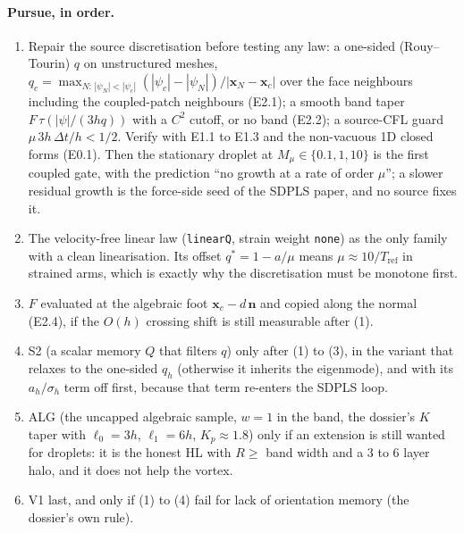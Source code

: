 \documentclass[11pt,a4paper]{article}
\newcommand{\bn}{\mathbf{n}}
\newcommand{\bx}{\mathbf{x}}
\begin{document}
\paragraph{Pursue, in order.}
\begin{enumerate}
  \item Repair the source discretisation before testing any law: a one-sided (Rouy--Tourin) $q$
  on unstructured meshes, $q_c=\max_{N:\,|\psi_N|<|\psi_c|}(|\psi_c|-|\psi_N|)/|\bx_N-\bx_c|$
  over the face neighbours including the coupled-patch neighbours (E2.1); a smooth band taper
  $F\,\tau(|\psi|/(3hq))$ with a $C^2$ cutoff, or no band (E2.2); a source-CFL guard
  $\mu\,3h\,\Delta t/h<1/2$. Verify with E1.1 to E1.3 and the non-vacuous 1D closed forms
  (E0.1). Then the stationary droplet at $M_\mu\in\{0.1,1,10\}$ is the first coupled gate, with
  the prediction ``no growth at a rate of order $\mu$''; a slower residual growth is the
  force-side seed of the SDPLS paper, and no source fixes it.
  \item The velocity-free linear law (\texttt{linearQ}, strain weight \texttt{none}) as the
  only family with a clean linearisation. Its offset $q^*=1-a/\mu$ means $\mu\approx10/T_\mathrm{ref}$
  in strained arms, which is exactly why the discretisation must be monotone first.
  \item $F$ evaluated at the algebraic foot $\bx_c-d\,\bn$ and copied along the normal (E2.4),
  if the $O(h)$ crossing shift is still measurable after (1).
  \item S2 (a scalar memory $Q$ that filters $q$) only after (1) to (3), in the variant that
  relaxes to the one-sided $q_h$ (otherwise it inherits the eigenmode), and with its
  $a_h/\sigma_h$ term off first, because that term re-enters the SDPLS loop.
  \item ALG (the uncapped algebraic sample, $w=1$ in the band, the dossier's $K$ taper with
  $\ell_0=3h$, $\ell_1=6h$, $K_p\approx1.8$) only if an extension is still wanted for droplets:
  it is the honest HL with $R\ge$ band width and a 3 to 6 layer halo, and it does not help the
  vortex.
  \item V1 last, and only if (1) to (4) fail for lack of orientation memory (the dossier's own
  rule).
\end{enumerate}
\end{document}
